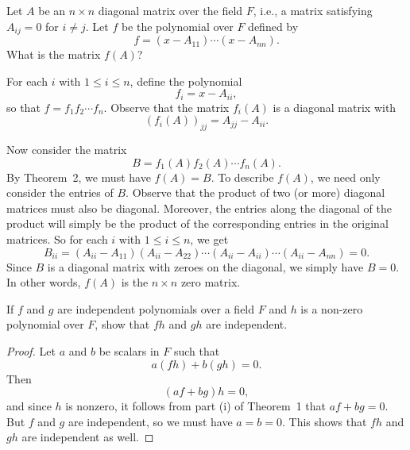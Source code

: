  Let $A$ be an $n\times n$ diagonal matrix over the field
$F$, i.e., a matrix satisfying $A_{ij} = 0$ for $i\neq j$. Let $f$ be
the polynomial over $F$ defined by
\begin{equation*}
  f = (x - A_{11})\cdots(x - A_{nn}).
\end{equation*}
What is the matrix $f(A)$?
\begin{solution}
  For each $i$ with $1\leq i\leq n$, define the polynomial
  \begin{equation*}
    f_i = x - A_{ii},
  \end{equation*}
  so that $f = f_1f_2\cdots f_n$. Observe that the matrix $f_i(A)$
  is a diagonal matrix with
  \begin{equation*}
    (f_i(A))_{jj} = A_{jj} - A_{ii}.
  \end{equation*}

  Now consider the matrix
  \begin{equation*}
    B = f_1(A)f_2(A)\cdots f_n(A).
  \end{equation*}
  By Theorem~2, we must have $f(A) = B$. To describe $f(A)$, we need
  only consider the entries of $B$. Observe that the product of two
  (or more) diagonal matrices must also be diagonal. Moreover, the
  entries along the diagonal of the product will simply be the product
  of the corresponding entries in the original matrices. So for each
  $i$ with $1\leq i\leq n$, we get
  \begin{equation*}
    B_{ii} = (A_{ii} - A_{11})(A_{ii} - A_{22})\cdots
    (A_{ii} - A_{ii})\cdots(A_{ii} - A_{nn}) = 0.
  \end{equation*}
  Since $B$ is a diagonal matrix with zeroes on the diagonal, we
  simply have $B = 0$. In other words, $f(A)$ is the $n\times n$ zero
  matrix.
\end{solution}

 If $f$ and $g$ are independent polynomials over a field $F$
and $h$ is a non-zero polynomial over $F$, show that $fh$ and $gh$ are
independent.
\begin{proof}
  Let $a$ and $b$ be scalars in $F$ such that
  \begin{equation*}
    a(fh) + b(gh) = 0.
  \end{equation*}
  Then
  \begin{equation*}
    (af + bg)h = 0,
  \end{equation*}
  and since $h$ is nonzero, it follows from part (i) of Theorem~1 that
  $af+bg = 0$. But $f$ and $g$ are independent, so we must have
  $a = b = 0$. This shows that $fh$ and $gh$ are independent as well.
\end{proof}

